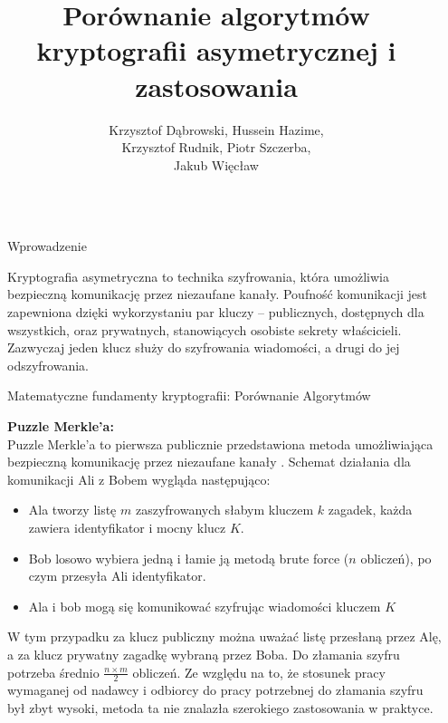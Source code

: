 \documentclass[final]{beamer}
\title{Porównanie algorytmów kryptografii asymetrycznej i zastosowania}
\author{Krzysztof Dąbrowski, Hussein Hazime, \\ Krzysztof Rudnik, Piotr Szczerba,\\ Jakub Więcław}
\newlength{\sepwidth}
\newlength{\colwidth}
\newcommand{\separatorcolumn}{\begin{column}{\sepwidth}\end{column}}
\begin{document}

\begin{frame}[t]
\begin{columns}[t]
\separatorcolumn

\begin{column}{\colwidth}

  \begin{block}{Wprowadzenie}

Kryptografia asymetryczna to technika szyfrowania, która umożliwia bezpieczną komunikację przez niezaufane kanały.
Poufność komunikacji jest zapewniona dzięki wykorzystaniu par kluczy – publicznych, dostępnych dla wszystkich, oraz prywatnych, stanowiących osobiste sekrety właścicieli. Zazwyczaj jeden klucz służy do szyfrowania wiadomości, a drugi do jej odszyfrowania.

  \end{block}

  \begin{block}{Matematyczne fundamenty kryptografii: Porównanie Algorytmów}




\textbf{Puzzle Merkle'a:}\\[10px]
Puzzle Merkle’a to pierwsza publicznie przedstawiona metoda umożliwiająca bezpieczną komunikację przez niezaufane kanały \cite{MerklePuzzles}.
Schemat działania dla komunikacji Ali z Bobem wygląda następująco:
\begin{itemize}
\item Ala tworzy listę \( m \) zaszyfrowanych słabym kluczem \( k \) zagadek, każda zawiera identyfikator i mocny klucz \( K \).
\item Bob losowo wybiera jedną i łamie ją metodą brute force (\( n \) obliczeń), po czym przesyła Ali identyfikator.
\item Ala i bob mogą się komunikować szyfrując wiadomości kluczem \( K \)\\[10px]
\end{itemize}
W tym przypadku za klucz publiczny można uważać listę przesłaną przez Alę, a za klucz prywatny zagadkę wybraną przez Boba. Do złamania szyfru potrzeba średnio \( \frac{n \times m}{2} \) obliczeń. Ze względu na to, że stosunek pracy wymaganej od nadawcy i odbiorcy do pracy potrzebnej do złamania szyfru był zbyt wysoki, 
metoda ta nie znalazła szerokiego zastosowania w praktyce.


\end{block}
\end{column}
\end{columns}
\end{frame}
\end{document}
